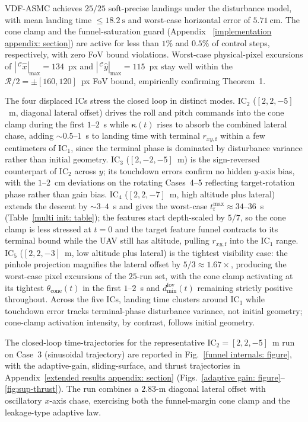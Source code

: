 \documentclass{IEEEtaes}
\begin{document}
VDF-ASMC achieves $25/25$ soft-precise landings under the disturbance model, with mean landing time $\le 18.2~\text{s}$ and worst-case horizontal error of $5.71~\text{cm}$. The cone clamp and the funnel-saturation guard (Appendix~
\ref{implementation appendix: section}) are active for less than $1\%$ and $0.5\%$ of control steps, respectively, with zero FoV bound violations. Worst-case physical-pixel excursions of $|\,^\mathcal{C}\hat{x}|_{\max}=134$~px and $|\,^\mathcal{C}\hat{y}|_{\max}=115$~px stay well within the $\mathcal{R}/2=\pm[160,120]$~px FoV bound, empirically confirming Theorem~1.

The four displaced ICs stress the closed loop in distinct modes. IC$_2$ ($[2,2,-5]$~m, diagonal lateral offset) drives the roll and pitch commands into the cone clamp during the first $1$--$2$~s while $\boldsymbol{\kappa}(t)$ rises to absorb the combined lateral chase, adding $\sim 0.5$--$1$~s to landing time with terminal $r_{xy,\text{f}}$ within a few centimeters of IC$_1$, since the terminal phase is dominated by disturbance variance rather than initial geometry. IC$_3$ ($[2,-2,-5]$~m) is the sign-reversed counterpart of IC$_2$ across $y$; its touchdown errors confirm no hidden $y$-axis bias, with the $1$--$2$~cm deviations on the rotating Cases~4--5 reflecting target-rotation phase rather than gain bias. IC$_4$ ($[2,2,-7]$~m, high altitude plus lateral) extends the descent by $\sim 3$--$4$~s and gives the worst-case $t_\text{f}^{\max}\approx 34$--$36$~s (Table~\ref{multi init: table}); the features start depth-scaled by $5/7$, so the cone clamp is less stressed at $t=0$ and the target feature funnel contracts to its terminal bound while the UAV still has altitude, pulling $r_{xy,\text{f}}$ into the IC$_1$ range. IC$_5$ ($[2,2,-3]$~m, low altitude plus lateral) is the tightest visibility case: the pinhole projection magnifies the lateral offset by $5/3\approx 1.67\times$, producing the worst-case pixel excursions of the $25$-run set, with the cone clamp activating at its tightest $\theta_\text{cone}(t)$ in the first $1$--$2$~s and $d_\text{min}^\text{fov}(t)$ remaining strictly positive throughout. Across the five ICs, landing time clusters around IC$_1$ while touchdown error tracks terminal-phase disturbance variance, not initial geometry; cone-clamp activation intensity, by contrast, follows initial geometry.

The closed-loop time-trajectories for the representative IC$_2=[2,2,-5]$~m run on Case~3 (sinusoidal trajectory) are reported in Fig.~\ref{funnel internals: figure}, with the adaptive-gain, sliding-surface, and thrust trajectories in Appendix~\ref{extended results appendix: section} (Figs.~\ref{adaptive gain: figure}--\ref{fig:sup-thrust}). The run combines a $2.83$-m diagonal lateral offset with oscillatory $x$-axis chase, exercising both the funnel-margin cone clamp and the leakage-type adaptive law.
\end{document}
